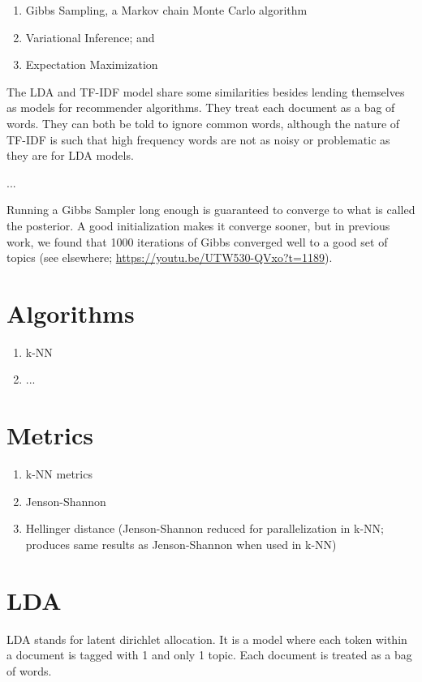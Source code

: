 \begin{enumerate}
  \item Gibbs Sampling, a Markov chain Monte Carlo algorithm
  \item Variational Inference; and
  \item Expectation Maximization
\end{enumerate}

The LDA and TF-IDF model share some similarities besides lending themselves as models for recommender algorithms. They treat each document as a bag of words. They can both be told to ignore common words, although the nature of TF-IDF is such that high frequency words are not as noisy or problematic as they are for LDA models.

...

Running a Gibbs Sampler long enough is guaranteed to converge to what is called the posterior. A good initialization makes it converge sooner, but in previous work, we found that 1000 iterations of Gibbs converged well to a good set of topics (see elsewhere; \url{https://youtu.be/UTW530-QVxo?t=1189}).

\section{Algorithms}
\begin{enumerate}
  \item k-NN
  \item ...
\end{enumerate}

\section{Metrics}
\begin{enumerate}
  \item k-NN metrics
  \item Jenson-Shannon
  \item Hellinger distance (Jenson-Shannon reduced for parallelization in k-NN; produces same results as Jenson-Shannon when used in k-NN)
\end{enumerate}

\section{LDA}
LDA stands for latent dirichlet allocation. It is a model where each token within a document is tagged with 1 and only 1 topic. Each document is treated as a bag of words.

